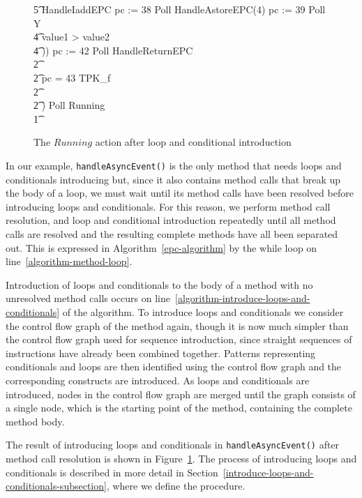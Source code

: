 \begin{figure}[tp!]
{\begin{circus}
    \t5 HandleIaddEPC \circseq pc := 38 \circseq Poll \circseq HandleAstoreEPC(4) \circseq pc := 39 \circseq Poll \circseq Y \\
    \t4 {} \circelse value1 > value2 \circthen \Skip \\
    \t4 \circfi)) \circseq pc := 42 \circseq Poll \circseq HandleReturnEPC \\
    \t2 {} \cdots {} \\
    \t2 {} \circelse pc = 43 \circthen TPK\_f \\
    \t2 {} \cdots {} \\
    \t2 \circfi) \circseq Poll \circseq Running \\
    \t1 \circfi
  \end{circus}
  }
  \caption{The $Running$ action after loop and conditional introduction}
  \label{loop-and-conditional-introduction-example-figure}
\end{figure}

In our example, \texttt{handleAsyncEvent()} is the only method that
needs loops and conditionals introducing but, since it also contains
method calls that break up the body of a loop, we must wait until its
method calls have been resolved before introducing loops and
conditionals.
For this reason, we perform method call resolution, and loop and
conditional introduction repeatedly until all method calls are
resolved and the resulting complete methods have all been separated
out.
This is expressed in Algorithm~\ref{epc-algorithm} by the while loop
on line~\ref{algorithm-method-loop}.

Introduction of loops and conditionals to the body of a method with no
unresolved method calls occurs on
line~\ref{algorithm-introduce-loops-and-conditionals} of the
algorithm.
To introduce loops and conditionals we consider the control flow graph
of the method again, though it is now much simpler than the control
flow graph used for sequence introduction, since straight sequences of
instructions have already been combined together.
Patterns representing conditionals and loops are then identified using
the control flow graph and the corresponding constructs are
introduced.
As loops and conditionals are introduced, nodes in the control flow
graph are merged until the graph consists of a single node, which is
the starting point of the method, containing the complete method body.

The result of introducing loops and conditionals in
\texttt{handleAsyncEvent()} after method call resolution is shown in
Figure~\ref{loop-and-conditional-introduction-example-figure}.
The process of introducing loops and conditionals is described in more
detail in Section~\ref{introduce-loops-and-conditionals-subsection},
where we define the  procedure.

